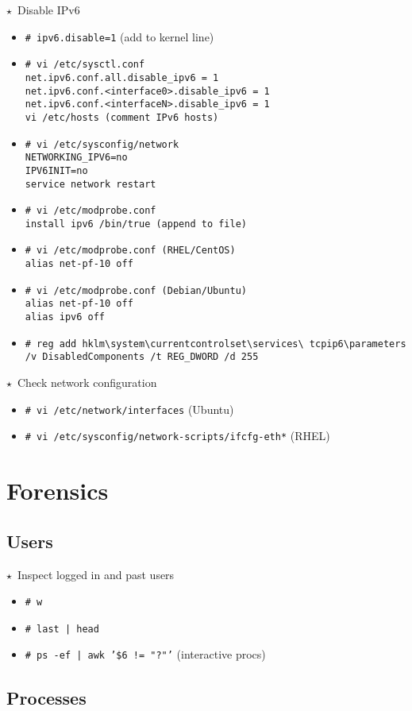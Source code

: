 \documentclass[10pt,landscape]{article}
\newcommand{\os}[1]{\texttt{\footnotesize{#1}}}
\newcommand{\unix}{\os{U}}
\newcommand{\linux}{\os{L}}
\newcommand{\windows}{\os{W}}
\newenvironment{action}[1]
  {\begin{minipage}[c]{\linewidth}$\star$~#1\begin{itemize}[leftmargin=1cm]}
  {\end{itemize}\end{minipage}\vspace*{3pt}}
\newcommand{\cmd}[2]{\item[#1] {\small\tt\# #2}}
\newcommand{\comment}[1]{\textrm{\small(#1)}}
\begin{document}
\begin{multicols*}{3}
\begin{action}{Disable IPv6}
  \cmd{\linux}{ipv6.disable=1} \comment{add to kernel line}
  \cmd{\linux}{vi /etc/sysctl.conf\\
    net.ipv6.conf.all.disable\_ipv6 = 1\\
    net.ipv6.conf.<interface0>.disable\_ipv6 = 1\\
    net.ipv6.conf.<interfaceN>.disable\_ipv6 = 1\\
    vi /etc/hosts \comment{comment IPv6 hosts}}
  \cmd{\linux}{vi /etc/sysconfig/network\\
    NETWORKING\_IPV6=no\\
    IPV6INIT=no\\
    service network restart}
  \cmd{\linux}{vi /etc/modprobe.conf\\
    install ipv6 /bin/true \comment{append to file}}
  \cmd{\linux}{vi /etc/modprobe.conf  \comment{RHEL/CentOS}\\
    alias net-pf-10 off}
  \cmd{\linux}{vi /etc/modprobe.conf \comment{Debian/Ubuntu}\\
    alias net-pf-10 off \\
    alias ipv6 off}
    \cmd{\windows}{reg add
    hklm{\textbackslash}system{\textbackslash}currentcontrolset{\textbackslash}services{\textbackslash}
    tcpip6{\textbackslash}parameters /v DisabledComponents /t REG\_DWORD /d 255}
\end{action}

\begin{action}{Check network configuration}
  \cmd{\linux}{vi /etc/network/interfaces} \comment{Ubuntu}
  \cmd{\linux}{vi /etc/sysconfig/network-scripts/ifcfg-eth*} \comment{RHEL}
\end{action}

\section*{Forensics}

\subsection*{Users}

\begin{action}{Inspect logged in and past users}
  \cmd{\unix}{w}
  \cmd{\unix}{last | head}
  \cmd{\unix}{ps -ef | awk '\$6 != "?"'} (interactive procs)
\end{action}

\subsection*{Processes}


\end{multicols*}
\end{document}
